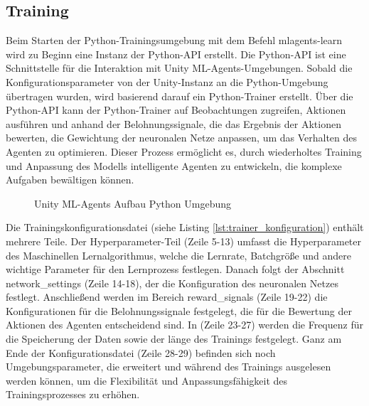 \subsection{Training}
Beim Starten der Python-Trainingsumgebung mit dem Befehl \grqq{}mlagents-learn\grqq{} wird zu Beginn eine Instanz der Python-API erstellt. Die Python-API ist eine Schnittstelle für die Interaktion mit Unity ML-Agents-Umgebungen. Sobald die Konfigurationsparameter von der Unity-Instanz an die Python-Umgebung übertragen wurden, wird basierend darauf ein Python-Trainer erstellt. Über die Python-API kann der Python-Trainer auf Beobachtungen zugreifen, Aktionen ausführen und anhand der Belohnungssignale, die das Ergebnis der Aktionen bewerten, die Gewichtung der neuronalen Netze anpassen, um das Verhalten des Agenten zu optimieren. Dieser Prozess ermöglicht es, durch wiederholtes Training und Anpassung des Modells intelligente Agenten zu entwickeln, die komplexe Aufgaben bewältigen können.

\begin{figure}[H]
  \centering  
  \caption{Unity ML-Agents Aufbau Python Umgebung}
  \label{fig:mlagents_aufbau_python}
\end{figure}

Die Trainingskonfigurationsdatei (siehe Listing \ref{lst:trainer_konfiguration}) enthält mehrere Teile. Der Hyperparameter-Teil (Zeile 5-13) umfasst die Hyperparameter des Maschinellen Lernalgorithmus, welche die Lernrate, Batchgröße und andere wichtige Parameter für den Lernprozess festlegen. Danach folgt der Abschnitt network\_settings (Zeile 14-18), der die Konfiguration des neuronalen Netzes festlegt. Anschließend werden im Bereich reward\_signals (Zeile 19-22) die Konfigurationen für die Belohnungssignale festgelegt, die für die Bewertung der Aktionen des Agenten entscheidend sind. In (Zeile 23-27) werden die Frequenz für die Speicherung der Daten sowie der länge des Trainings festgelegt. Ganz am Ende der Konfigurationsdatei (Zeile 28-29) befinden sich noch Umgebungsparameter, die erweitert und während des Trainings ausgelesen werden können, um die Flexibilität und Anpassungsfähigkeit des Trainingsprozesses zu erhöhen.

